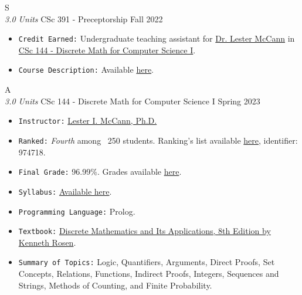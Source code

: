 \cventry
{S \\ \small{\textit{3.0 Units}}}
{CSc 391 - Preceptorship}
{Fall 2022}
{}
{}
{
  \begin{itemize}
    \item \texttt{Credit Earned:} Undergraduate teaching assistant for \href{https://mccann.cs.arizona.edu/}{Dr. Lester McCann} in \href{https://www2.cs.arizona.edu/classes/cs144/fall23-002/}{CSc 144 - Discrete Math for Computer Science I}.
    \item \texttt{Course Description:} Available \href{https://mhrezaei.com/assets/cv/courses/Fall2023/CSC391/Syllabus.pdf}{here}.
  \end{itemize}
}

\cventry
{A \\ \small{\textit{3.0 Units}}}
{CSc 144 - Discrete Math for Computer Science I}
{Spring 2023}
{}
{}
{
  \begin{itemize}
    \item \texttt{Instructor:} \href{http://mccann.cs.arizona.edu}{Lester I. McCann, Ph.D.}
    \item \texttt{Ranked:} \textit{Fourth} among ~250 students. Ranking's list available \href{https://mhrezaei.com/assets/cv/courses/Spring2023/CSC144/Rankings.pdf}{here}, identifier: 974718.
    \item \texttt{Final Grade:} 96.99\%. Grades available \href{https://mhrezaei.com/assets/cv/courses/Spring2023/CSC144/Grades.pdf}{here}.
    \item \texttt{Syllabus:} \href{https://mhrezaei.com/assets/cv/courses/Spring2023/CSC144/Syllabus.pdf}{Available here}.
    \item \texttt{Programming Language:} Prolog.
    \item \texttt{Textbook:} \href{https://www.mheducation.com/highered/product/M125967651X.html}{Discrete Mathematics and Its Applications, 8th Edition by Kenneth Rosen}.
    \item \texttt{Summary of Topics:} Logic, Quantifiers, Arguments, Direct Proofs, Set Concepts, Relations, Functions, Indirect Proofs, Integers, Sequences and Strings, Methods of Counting, and Finite Probability.
  \end{itemize}
}


